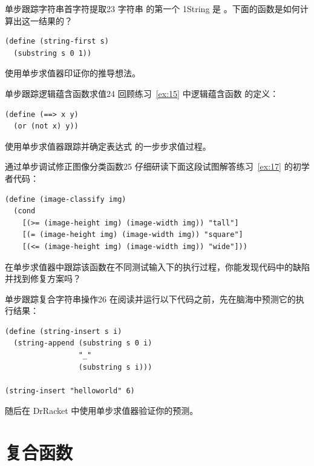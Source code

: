 \begin{exercise}{单步跟踪字符串首字符提取}{23}
字符串  的第一个 1String 是 。下面的函数是如何计算出这一结果的？
\begin{lstlisting}[language=BSL]
(define (string-first s)
  (substring s 0 1))
\end{lstlisting}
使用单步求值器印证你的推导想法。
\end{exercise}

\begin{exercise}{单步跟踪逻辑蕴含函数求值}{24}
回顾练习~\ref{ex:15} 中逻辑蕴含函数 \code{==>} 的定义：
\begin{lstlisting}[language=BSL]
(define (==> x y)
  (or (not x) y))
\end{lstlisting}
使用单步求值器跟踪并确定表达式  的一步步求值过程。
\end{exercise}

\begin{exercise}{通过单步调试修正图像分类函数}{25}
仔细研读下面这段试图解答练习~\ref{ex:17} 的初学者代码：
\begin{lstlisting}[language=BSL, basicstyle=\scriptsize\ttfamily]
(define (image-classify img)
  (cond
    [(>= (image-height img) (image-width img)) "tall"]
    [(= (image-height img) (image-width img)) "square"]
    [(<= (image-height img) (image-width img)) "wide"]))
\end{lstlisting}
在单步求值器中跟踪该函数在不同测试输入下的执行过程，你能发现代码中的缺陷并找到修复方案吗？
\end{exercise}

\begin{exercise}{单步跟踪复合字符串操作}{26}
在阅读并运行以下代码之前，先在脑海中预测它的执行结果：
\begin{lstlisting}[language=BSL]
(define (string-insert s i)
  (string-append (substring s 0 i)
                 "_"
                 (substring s i)))

(string-insert "helloworld" 6)
\end{lstlisting}
随后在 DrRacket 中使用单步求值器验证你的预测。
\end{exercise}


\section{复合函数}
\label{sec:2.3}

